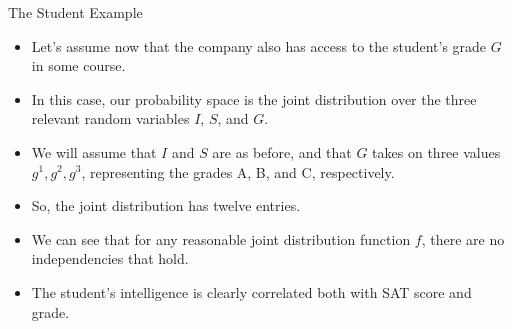 \documentclass[handout]{beamer}
\begin{document}
\begin{frame}{The Student Example}
\scriptsize{
\begin{itemize}

\item Let's assume now that the company also has access to the student's grade $G$ in some course. 
\item In this case, our probability space is the joint distribution over the
three relevant random variables $I$, $S$, and $G$. 

\item We will assume that $I$ and $S$ are as before, and that $G$ takes on three values $g^1, g^2, g^3$, representing the grades A, B, and C, respectively.

\item So, the joint distribution has twelve entries.

\item We can see that for any reasonable joint distribution function $f$, there are no independencies that hold.
\item The student's intelligence is clearly correlated both with SAT score and  grade.


\end{itemize}



} 

\end{frame}
\end{document}
